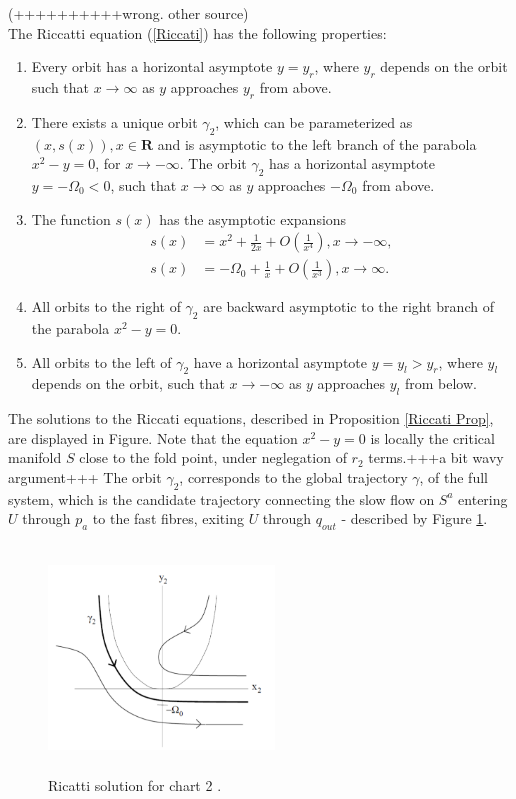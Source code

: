 \begin{prop}(++++++++++wrong. other source)\label{Riccati Prop} \\
The Riccatti equation (\ref{Riccati}) has the following properties:
\begin{enumerate}
\item Every orbit has a horizontal asymptote $y=y_r$, where $y_r$ depends on the orbit such that $x \to \infty$ as $y$ approaches $y_r$ from above.
\item There exists a unique orbit $\gamma_2$, which can be parameterized as $(x,s(x)), x \in \mathbf{R}$ and is asymptotic to the left branch of the parabola $x^2 - y = 0$, for $x \to - \infty$. The orbit $\gamma_2$ has a horizontal asymptote $y= - \Omega_0 <0$, such that $x \to \infty$ as $y$ approaches $-\Omega_0$ from above.
\item The function $s(x)$ has the asymptotic expansions
\begin{align*}
s(x) &= x^2 + \frac{1}{2x} + O\left( \frac{1}{x^4} \right), x \to -\infty,\\
s(x) &= -\Omega_0 + \frac{1}{x} + O\left( \frac{1}{x^3} \right), x \to \infty.
\end{align*}
\item All orbits to the right of $\gamma_2$  are backward asymptotic to the right branch of the parabola $x^2-y=0$.
\item All orbits to the left of $\gamma_2$ have a horizontal asymptote $y=y_l>y_r$, where $y_l$ depends on the orbit, such that $x \to -\infty$ as $y$ approaches $y_l$ from below.
\end{enumerate}
\end{prop}

The solutions to the Riccati equations, described in Proposition \ref{Riccati Prop}, are displayed in Figure. Note that the equation $x^2 - y=0$ is locally the critical manifold $S$ close to the fold point, under neglegation of $r_2$ terms.+++a bit wavy argument+++
The orbit $\gamma_2$, corresponds to the global trajectory $\gamma$, of the full system, which is the candidate trajectory connecting the slow flow on $S^a$ entering $U$ through $p_a$ to the fast fibres, exiting $U$ through $q_{out}$ - described by Figure \ref{fig: Ricatti Sol}. 
\begin{figure}[h!]\centering
	\includegraphics[height=6cm,width=6cm]{Images/Dynamics_in_K2}
	\caption{Ricatti solution for chart 2 \citep{krupa2001}.}
	\label{fig: Ricatti Sol}
\end{figure}\newpage
 
